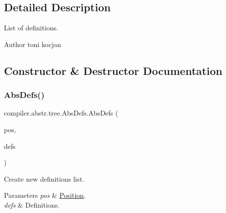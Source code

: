 \subsection{Detailed Description}
List of definitions.

\begin{DoxyAuthor}{Author}
toni kocjan 
\end{DoxyAuthor}


\subsection{Constructor \& Destructor Documentation}
\mbox{\label{classcompiler_1_1abstr_1_1tree_1_1_abs_defs_af7341645192f5d0340f95596765c19a0}} 
\subsubsection{\texorpdfstring{Abs\+Defs()}{AbsDefs()}\hspace{0.1cm}{\footnotesize\ttfamily [1/2]}}
{\footnotesize\ttfamily compiler.\+abstr.\+tree.\+Abs\+Defs.\+Abs\+Defs (\begin{DoxyParamCaption}\item[{\hyperlink{classcompiler_1_1_position}{Position}}]{pos,  }\item[{Linked\+List$<$ \hyperlink{classcompiler_1_1abstr_1_1tree_1_1def_1_1_abs_def}{Abs\+Def} $>$}]{defs }\end{DoxyParamCaption})}

Create new definitions list.


\begin{DoxyParams}{Parameters}
{\em pos} & \hyperlink{classcompiler_1_1_position}{Position}. \\
\hline
{\em defs} & Definitions. \\
\hline
\end{DoxyParams}
\mbox{\label{classcompiler_1_1abstr_1_1tree_1_1_abs_defs_a1d9cc2674048c7223c01801fe2c9ab80}} 
